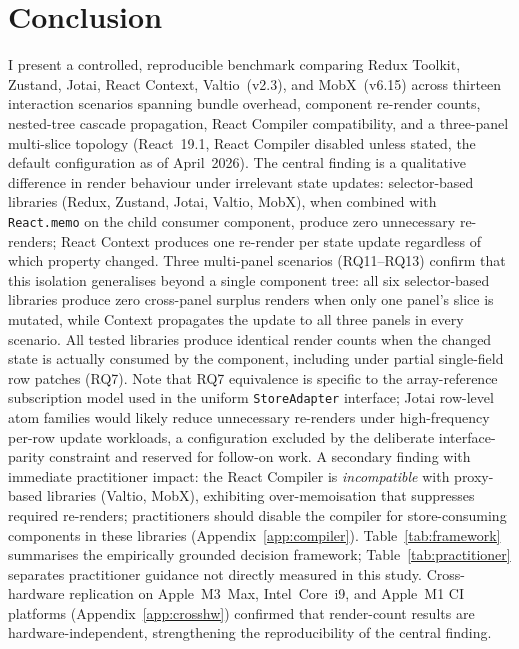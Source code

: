 \documentclass[conference]{IEEEtran}
\newcommand{\code}[1]{\texttt{\small #1}}
\begin{document}
\section{Conclusion}
\label{sec:conclusion}

I present a controlled, reproducible benchmark comparing Redux
Toolkit, Zustand, Jotai, React Context, Valtio~(v2.3), and
MobX~(v6.15) across thirteen interaction scenarios spanning bundle
overhead, component re-render counts, nested-tree cascade propagation,
React Compiler compatibility, and a three-panel multi-slice topology
(React~19.1, React Compiler disabled unless stated, the default
configuration as of April~2026).
The central finding is a
qualitative difference in render behaviour under irrelevant state
updates: selector-based libraries (Redux, Zustand, Jotai, Valtio,
MobX), when combined
with \code{React.memo} on the child consumer component, produce zero
unnecessary re-renders; React Context produces one re-render per state
update regardless of which property changed.
Three multi-panel scenarios (RQ11--RQ13) confirm that this isolation
generalises beyond a single component tree: all six selector-based
libraries produce zero cross-panel surplus renders when only one
panel's slice is mutated, while Context propagates the update to all
three panels in every scenario.
All tested libraries produce
identical render counts when the changed state is actually consumed by
the component, including under partial single-field row patches (RQ7).
Note that RQ7 equivalence is specific to the array-reference
subscription model used in the uniform \code{StoreAdapter} interface;
Jotai row-level atom families would likely reduce unnecessary
re-renders under high-frequency per-row update workloads, a
configuration excluded by the deliberate interface-parity constraint
and reserved for follow-on work.
A secondary finding with immediate practitioner impact: the React
Compiler is \emph{incompatible} with proxy-based libraries (Valtio,
MobX), exhibiting over-memoisation that suppresses required re-renders;
practitioners should disable the compiler for store-consuming
components in these libraries
(Appendix~\ref{app:compiler}).
Table~\ref{tab:framework} summarises the empirically grounded decision
framework; Table~\ref{tab:practitioner} separates practitioner guidance
not directly measured in this study.
Cross-hardware replication on Apple~M3~Max, Intel~Core~i9, and Apple~M1
CI platforms (Appendix~\ref{app:crosshw}) confirmed that render-count
results are hardware-independent, strengthening the reproducibility of
the central finding.
\end{document}
